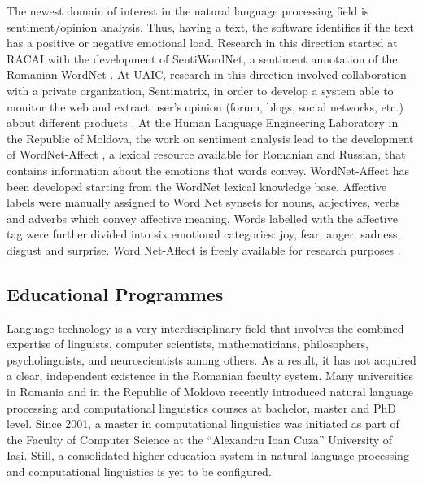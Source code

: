 \documentclass[]{../../metanetpaper}
\begin{document}
\begin{multicols}{2}
The newest domain of interest in the natural language processing field is sentiment/opinion analysis. Thus, having a text, the software identifies if the text has a positive or negative emotional load. Research in this direction started at RACAI with the development of SentiWordNet, a sentiment annotation of the Romanian WordNet \cite{sentiwn}. At UAIC, research in this direction involved collaboration with a private organization, Sentimatrix, in order to develop a system able to monitor the web and extract user’s opinion (forum, blogs, social networks, etc.) about different products \cite{sentimatrix}. At the Human Language Engineering Laboratory in the Republic of Moldova, the work on sentiment analysis lead to the development of WordNet-Affect \cite{senti_md}, a lexical resource available for Romanian and Russian, that contains information about the emotions that words convey. WordNet-Affect has been developed starting from the WordNet lexical knowledge base. Affective labels were manually assigned to Word Net synsets for nouns, adjectives, verbs and adverbs which convey affective meaning. Words labelled with the affective tag were further divided into six emotional categories: joy, fear, anger, sadness, disgust and surprise. Word Net-Affect is freely available for research purposes \cite{wndom}.

\subsection{Educational Programmes}

Language technology is a very interdisciplinary field that involves the combined expertise of linguists, computer scientists, mathematicians, philosophers, psycholinguists, and neuroscientists among others. As a result, it has not acquired a clear, independent existence in the Romanian faculty system. Many universities in Romania and in the Republic of Moldova recently introduced natural language processing and computational linguistics courses at bachelor, master and PhD level. Since 2001, a master in computational linguistics was initiated as part of the Faculty of Computer Science at the “Alexandru Ioan Cuza” University of Iași. Still, a consolidated higher education system in natural language processing and computational linguistics is yet to be configured.


\end{multicols}
\end{document}

